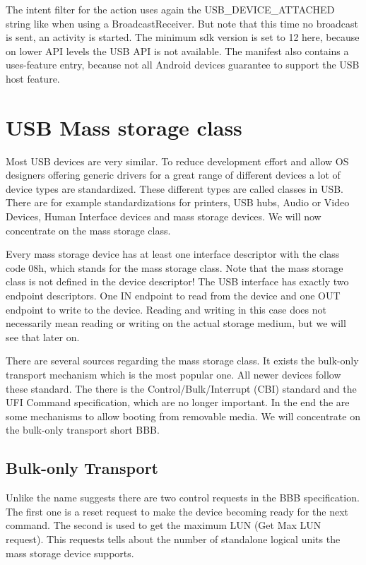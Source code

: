 The intent filter for the action uses again the USB\_DEVICE\_ATTACHED string like when using a BroadcastReceiver. But note that this time no broadcast is sent, an activity is started. The minimum sdk version is set to 12 here, because on lower API levels the USB API is not available. The manifest also contains a uses-feature entry, because not all Android devices guarantee to support the USB host feature\cite{android_usb_host}.

\chapter{USB Mass storage class}

Most USB devices are very similar. To reduce development effort and allow OS designers offering generic drivers for a great range of different devices a lot of device types are standardized. These different types are called classes in USB. There are for example standardizations for printers, USB hubs, Audio or Video Devices, Human Interface devices and mass storage devices. We will now concentrate on the mass storage class.

Every mass storage device has at least one interface descriptor with the class code 08h, which stands for the mass storage class. Note that the mass storage class is not defined in the device descriptor! The USB interface has exactly two endpoint descriptors. One IN endpoint to read from the device and one OUT endpoint to write to the device. Reading and writing in this case does not necessarily mean reading or writing on the actual storage medium, but we will see that later on.

There are several sources regarding the mass storage class. It exists the bulk-only transport mechanism which is the most popular one. All newer devices follow these standard. The there is the Control/Bulk/Interrupt (CBI) standard and the UFI Command specification, which are no longer important. In the end the are some mechanisms to allow booting from removable media. We will concentrate on the bulk-only transport short BBB.

\section{Bulk-only Transport}

Unlike the name suggests there are two control requests in the BBB specification. The first one is a reset request to make the device becoming ready for the next command. The second is used to get the maximum LUN (Get Max LUN request). This requests tells about the number of standalone logical units the mass storage device supports.

